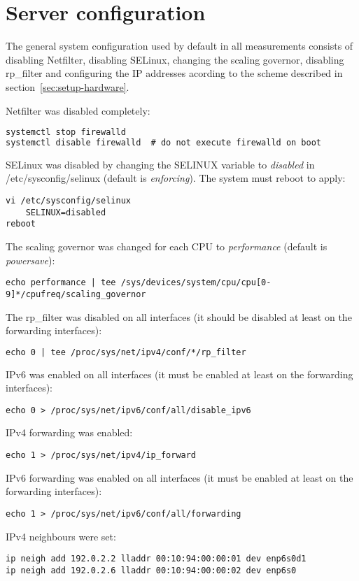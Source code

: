 
\section{Server configuration}
The general system configuration used by default in all measurements
consists of disabling Netfilter, disabling SELinux, changing the scaling governor, disabling rp\_filter and
configuring the IP addresses acording to the scheme described in section~\ref{sec:setup-hardware}.

Netfilter was disabled completely:
\begin{lstlisting}[language=TeX]
systemctl stop firewalld
systemctl disable firewalld  # do not execute firewalld on boot
\end{lstlisting}
SELinux was disabled by changing the SELINUX variable to {\it{disabled}} in /etc/sysconfig/selinux
(default is {\it{enforcing}}). The system must reboot to apply:
\begin{lstlisting}
vi /etc/sysconfig/selinux
	SELINUX=disabled
reboot
\end{lstlisting}
The scaling governor was changed for each CPU to {\it{performance}} (default is {\it{powersave}}):
\begin{lstlisting}
echo performance | tee /sys/devices/system/cpu/cpu[0-9]*/cpufreq/scaling_governor
\end{lstlisting}
The rp\_filter was disabled on all interfaces (it should be disabled at least on the forwarding interfaces):
\begin{lstlisting}[language=TeX]
echo 0 | tee /proc/sys/net/ipv4/conf/*/rp_filter
\end{lstlisting}
IPv6 was enabled on all interfaces (it must be enabled at least on the forwarding interfaces):
\begin{lstlisting}
echo 0 > /proc/sys/net/ipv6/conf/all/disable_ipv6
\end{lstlisting}
IPv4 forwarding was enabled:
\begin{lstlisting}
echo 1 > /proc/sys/net/ipv4/ip_forward
\end{lstlisting}
IPv6 forwarding was enabled on all interfaces (it must be enabled at least on the forwarding interfaces):
\begin{lstlisting}
echo 1 > /proc/sys/net/ipv6/conf/all/forwarding
\end{lstlisting}
IPv4 neighbours were set:
\begin{lstlisting}
ip neigh add 192.0.2.2 lladdr 00:10:94:00:00:01 dev enp6s0d1
ip neigh add 192.0.2.6 lladdr 00:10:94:00:00:02 dev enp6s0
\end{lstlisting}
